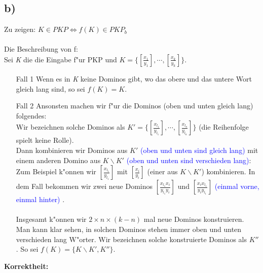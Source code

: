 \documentclass[a4paper,11pt]{scrartcl}
\begin{document}
	
	
	
	
	
		  	
\subsection*{b)}
	Zu zeigen: $K\in PKP \iff f(K) \in PKP_b$
	\\ \ \\
	Die Beschreibung von f:\\
	Sei \textit{K} die die Eingabe f"ur PKP und $K =\Big\{ \left[ \frac{x_1}{y_1}  \right] ,\cdots , \left[ \frac{x_k}{y_k}  \right] \Big\} $.
\begin{itemize}
\item [Fall 1] Wenn es in \textit{K} keine Dominos gibt, wo das obere und das untere Wort gleich lang sind, so sei $f(K)=K$.
\item [Fall 2] Ansonsten machen wir f"ur die Dominos (oben und unten gleich lang) folgendes:\\
		Wir bezeichnen solche Dominos als $K'=\big\{  \left[ \frac{x_{l_{1}}}{y_{l_{1}}} \right], \cdots ,\left[ \frac{x_{l_{n}}}{y_{l_{n}}} \right] \big\}$ (die Reihenfolge spielt keine Rolle).\\
		Dann kombinieren wir Dominos aus $K'$ \textcolor{blue}{(oben und unten sind gleich lang)} mit einem anderen Domino aus $K\backslash K'$ \textcolor{blue}{ (oben und unten sind verschieden lang)}:\\
		Zum Beispiel k"onnen wir  $\left[ \frac{x_{l_{1}}}{y_{l_{1}}} \right]$ mit $\left[ \frac{x_i}{y_i}  \right]$ (einer aus $K \backslash K'$) kombinieren. In dem Fall bekommen wir zwei neue Dominos $\left[ \frac{x_{l_{1}} x_i}{y_{l_{1}} y_i} \right]$ und $\left[ \frac{x_i x_{l_{1}}}{y_i y_{l_{1}}} \right]$ \textcolor{blue}{ (einmal vorne, einmal hinter) }.
		\\ \ \\
		Insgesamt k"onnen wir $2 \times n \times (k-n)$ mal neue Dominos konstruieren. Man kann klar sehen, in solchen Dominos stehen immer oben und unten verschieden lang W"orter. Wir bezeichnen solche konstruierte Dominos als $K''$. So sei $f(K) = \{ K\backslash K', K''\} $.
	\end{itemize}  
	
	\noindent \textbf{Korrektheit:}
	
\end{document}
